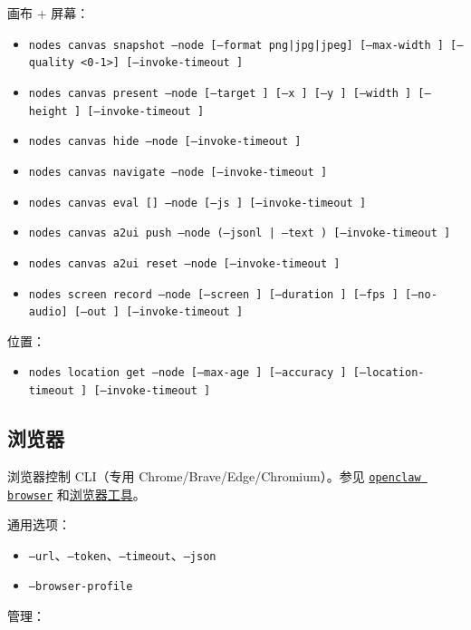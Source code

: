 画布 + 屏幕：

\begin{itemize}
  \item \texttt{nodes canvas snapshot --node  [--format png|jpg|jpeg] [--max-width ] [--quality <0-1>] [--invoke-timeout ]}
  \item \texttt{nodes canvas present --node  [--target ] [--x ] [--y ] [--width ] [--height ] [--invoke-timeout ]}
  \item \texttt{nodes canvas hide --node  [--invoke-timeout ]}
  \item \texttt{nodes canvas navigate  --node  [--invoke-timeout ]}
  \item \texttt{nodes canvas eval [] --node  [--js ] [--invoke-timeout ]}
  \item \texttt{nodes canvas a2ui push --node  (--jsonl  | --text ) [--invoke-timeout ]}
  \item \texttt{nodes canvas a2ui reset --node  [--invoke-timeout ]}
  \item \texttt{nodes screen record --node  [--screen ] [--duration ] [--fps ] [--no-audio] [--out ] [--invoke-timeout ]}
\end{itemize}


位置：

\begin{itemize}
  \item \texttt{nodes location get --node  [--max-age ] [--accuracy ] [--location-timeout ] [--invoke-timeout ]}
\end{itemize}


\subsection{浏览器}


浏览器控制 CLI（专用 Chrome/Brave/Edge/Chromium）。参见 \href{/cli/browser}{\texttt{openclaw browser}} 和\href{/tools/browser}{浏览器工具}。

通用选项：

\begin{itemize}
  \item \texttt{--url}、\texttt{--token}、\texttt{--timeout}、\texttt{--json}
  \item \texttt{--browser-profile }
\end{itemize}


管理：

